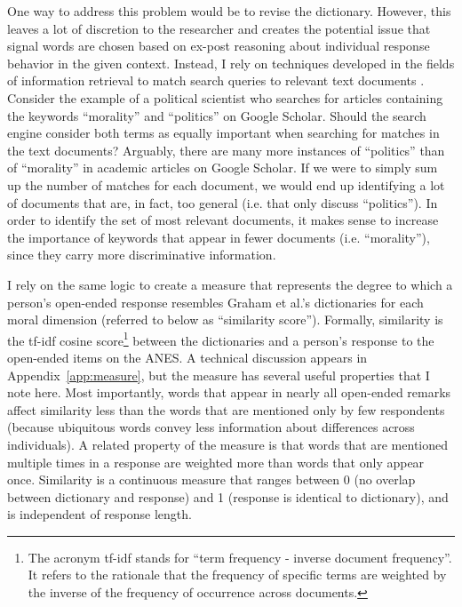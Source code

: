 \documentclass[12pt]{article}
\begin{document}
One way to address this problem would be to revise the dictionary. However, this leaves a lot of discretion to the researcher and creates the potential issue that signal words are chosen based on ex-post reasoning about individual response behavior in the given context. Instead, I rely on techniques developed in the fields of information retrieval to match search queries to relevant text documents \citep[see][for an introduction]{manning2008introduction}. Consider the example of a political scientist who searches for articles containing the keywords ``morality'' and ``politics'' on Google Scholar. Should the search engine consider both terms as equally important when searching for matches in the text documents? Arguably, there are many more instances of ``politics'' than of ``morality'' in academic articles on Google Scholar. If we were to simply sum up the number of matches for each document, we would end up identifying a lot of documents that are, in fact, too general (i.e. that only discuss ``politics''). In order to identify the set of most relevant documents, it makes sense to increase the importance of keywords that appear in fewer documents (i.e. ``morality''), since they carry more discriminative information.

I rely on the same logic to create a measure that represents the degree to which a person's open-ended response resembles Graham et al.'s \citeyearpar{graham2009liberals} dictionaries for each moral dimension (referred to below as ``similarity score''). Formally, similarity is the tf-idf cosine score\footnote{The acronym tf-idf stands for ``term frequency - inverse document frequency''. It refers to the rationale that the frequency of specific terms are weighted by the inverse of the frequency of occurrence across documents.} between the dictionaries and a person's response to the open-ended items on the ANES. A technical discussion appears in Appendix~\ref{app:measure}, but the measure has several useful properties that I note here. Most importantly, words that appear in nearly all open-ended remarks affect similarity less than the words that are mentioned only by few respondents (because ubiquitous words convey less information about differences across individuals). A related property of the measure is that words that are mentioned multiple times in a response are weighted more than words that only appear once. Similarity is a continuous measure that ranges between 0 (no overlap between dictionary and response) and 1 (response is identical to dictionary), and is independent of response length.
\end{document}

